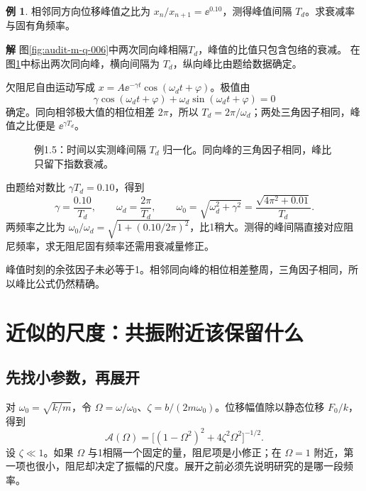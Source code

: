 \documentclass[11pt,openany,fontset=fandol]{ctexbook}
\theoremstyle{plain}\newtheorem{theorem}{定理}[chapter]\newtheorem{proposition}[theorem]{命题}
\theoremstyle{definition}\newtheorem{definition}{定义}[chapter]\newtheorem{example}{例}[chapter]
\theoremstyle{remark}\newtheorem*{remark}{说明}
\newcommand{\SolutionStart}{\par\nobreak\medskip\nobreak\noindent\textbf{解}\quad\ignorespaces}
\newenvironment{solution}{\SolutionStart}{\par\medskip}
\begin{document}
\begin{example}
相邻同方向位移峰值之比为 $x_n/x_{n+1}=\ee^{0.10}$，测得峰值间隔 $T_d$。求衰减率与固有角频率。
\end{example}

\begin{solution}
图\ref{fig:audit-m-q-006}中两次同向峰相隔$T_d$，峰值的比值只包含包络的衰减。
在图\ref{fig:eg-1-5}中标出两次同向峰，横向间隔为 $T_d$，纵向峰比由题给数据确定。

欠阻尼自由运动写成 $x=A\ee^{-\gamma t}\cos(\omega_dt+\varphi)$。极值由
\[
\gamma\cos(\omega_dt+\varphi)+\omega_d\sin(\omega_dt+\varphi)=0
\]
确定。同向相邻极大值的相位相差 $2\pi$，所以 $T_d=2\pi/\omega_d$；两处三角因子相同，峰值之比便是 $\ee^{\gamma T_d}$。

\begin{figure}[H]\centering
{}
\caption{例1.5：时间以实测峰间隔 $T_d$ 归一化。同向峰的三角因子相同，峰比只留下指数衰减。}\label{fig:eg-1-5}
\end{figure}

由题给对数比 $\gamma T_d=0.10$，得到
\[
\gamma=\frac{0.10}{T_d},\qquad
\omega_d=\frac{2\pi}{T_d},\qquad
\omega_0=\sqrt{\omega_d^2+\gamma^2}
=\frac{\sqrt{4\pi^2+0.01}}{T_d}.
\]
两频率之比为 $\omega_0/\omega_d=\sqrt{1+(0.10/2\pi)^2}$，比1稍大。测得的峰间隔直接对应阻尼频率，求无阻尼固有频率还需用衰减量修正。

峰值时刻的余弦因子未必等于1。相邻同向峰的相位相差整周，三角因子相同，所以峰比公式仍然精确。
\end{solution}

\section{近似的尺度：共振附近该保留什么}
\subsection{先找小参数，再展开}
对 $\omega_0=\sqrt{k/m}$，令 $\Omega=\omega/\omega_0$、$\zeta=b/(2m\omega_0)$。位移幅值除以静态位移 $F_0/k$，得到
\[
\mathcal A(\Omega)=\bigl[(1-\Omega^2)^2+4\zeta^2\Omega^2\bigr]^{-1/2}.
\]
设 $\zeta\ll1$。如果 $\Omega$ 与1相隔一个固定的量，阻尼项是小修正；在 $\Omega=1$ 附近，第一项也很小，阻尼却决定了振幅的尺度。展开之前必须先说明研究的是哪一段频率。
\end{document}
